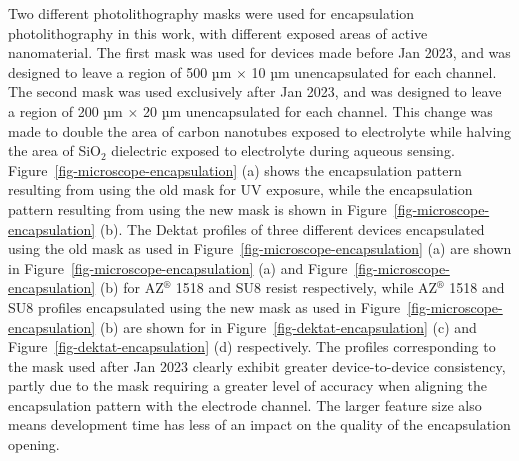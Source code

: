 \documentclass[
  a4paper,
]{scrbook}
\begin{document}
Two different photolithography masks were used for encapsulation
photolithography in this work, with different exposed areas of active
nanomaterial. The first mask was used for devices made before Jan 2023,
and was designed to leave a region of 500 µm \(\times\) 10 µm
unencapsulated for each channel. The second mask was used exclusively
after Jan 2023, and was designed to leave a region of 200 µm \(\times\)
20 µm unencapsulated for each channel. This change was made to double
the area of carbon nanotubes exposed to electrolyte while halving the
area of SiO\(_2\) dielectric exposed to electrolyte during aqueous
sensing. Figure~\ref{fig-microscope-encapsulation} (a) shows the
encapsulation pattern resulting from using the old mask for UV exposure,
while the encapsulation pattern resulting from using the new mask is
shown in Figure~\ref{fig-microscope-encapsulation} (b). The Dektat
profiles of three different devices encapsulated using the old mask as
used in Figure~\ref{fig-microscope-encapsulation} (a) are shown in
Figure~\ref{fig-microscope-encapsulation} (a) and
Figure~\ref{fig-microscope-encapsulation} (b) for AZ\(^\circledR\) 1518
and SU8 resist respectively, while AZ\(^\circledR\) 1518 and SU8
profiles encapsulated using the new mask as used in
Figure~\ref{fig-microscope-encapsulation} (b) are shown for in
Figure~\ref{fig-dektat-encapsulation} (c) and
Figure~\ref{fig-dektat-encapsulation} (d) respectively. The profiles
corresponding to the mask used after Jan 2023 clearly exhibit greater
device-to-device consistency, partly due to the mask requiring a greater
level of accuracy when aligning the encapsulation pattern with the
electrode channel. The larger feature size also means development time
has less of an impact on the quality of the encapsulation opening.
\end{document}
